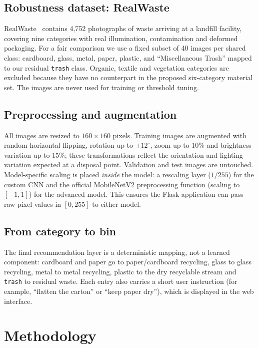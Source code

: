 \documentclass[11pt,a4paper]{article}
\begin{document}
\subsection{Robustness dataset: RealWaste}
RealWaste~\citep{single2023realwaste} contains 4,752 photographs of waste arriving at a
landfill facility, covering nine categories with real illumination, contamination and
deformed packaging. For a fair comparison we use a fixed subset of 40 images per shared
class: cardboard, glass, metal, paper, plastic, and ``Miscellaneous Trash'' mapped to our
residual \texttt{trash} class. Organic, textile and vegetation categories are excluded
because they have no counterpart in the proposed six-category material set. The images are
never used for training or threshold tuning.

\subsection{Preprocessing and augmentation}
All images are resized to $160\times160$ pixels. Training images are augmented with random
horizontal flipping, rotation up to $\pm 12^\circ$, zoom up to 10\% and brightness variation
up to 15\%; these transformations reflect the orientation and lighting variation expected
at a disposal point. Validation and test images are untouched. Model-specific scaling is
placed \emph{inside} the model: a rescaling layer ($1/255$) for the custom CNN and the
official MobileNetV2 preprocessing function (scaling to $[-1,1]$) for the advanced model.
This ensures the Flask application can pass raw pixel values in $[0,255]$ to either model.

\subsection{From category to bin}
The final recommendation layer is a deterministic mapping, not a learned component:
cardboard and paper go to paper/cardboard recycling, glass to glass recycling, metal to
metal recycling, plastic to the dry recyclable stream and \texttt{trash} to residual waste.
Each entry also carries a short user instruction (for example, ``flatten the carton''
or ``keep paper dry''), which is displayed in the web interface.

\section{Methodology}
\label{sec:method}
\end{document}

